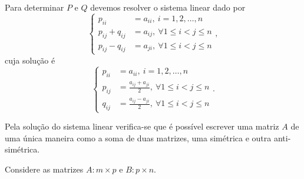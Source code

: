 \begin{questions}
\begin{parts}
\begin{solution}
            Para determinar $P$ e $Q$ devemos resolver o sistema linear dado por
            \[
            \left\{
            \begin{aligned}
                p_{ii} &= a_{ii}, \ i = 1, 2, \ldots, n \\
                p_{ij} + q_{ij} &= a_{ij}, \ \forall 1 \leq i < j \leq n \\
                p_{ij} - q_{ij} &= a_{ji}, \ \forall 1 \leq i < j \leq n
            \end{aligned}
            \right. ,
            \]
            cuja solu\c{c}\~{a}o \'{e}
            \[
            \left\{
            \begin{aligned}
                p_{ii} &= a_{ii}, \ i = 1, 2, \ldots, n \\
                p_{ij} &= \frac{a_{ij} + a_{ji}}{2}, \ \forall 1 \leq i < j \leq n \\
                q_{ij} &= \frac{a_{ij} - a_{ji}}{2}, \ \forall 1 \leq i < j \leq n
            \end{aligned}
            \right. .
            \]

            Pela solu\c{c}\~{a}o do sistema linear verifica-se que \'{e} poss\'{i}vel escrever uma matriz $A$ de uma \'{u}nica maneira como a soma de duas matrizes, uma sim\'{e}trica e outra anti-sim\'{e}trica.
        \end{solution}
    \end{parts}

    \question Considere as matrizes $A : m \times p$ e $B : p \times n$.
\end{questions}
